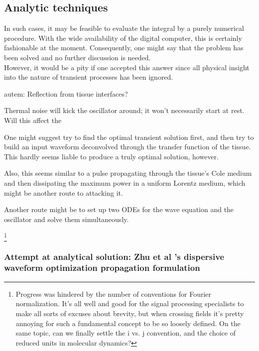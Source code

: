 \documentclass[paper.tex]{subfiles}
\begin{document}
\subsection{Analytic techniques}


\begin{fquote}
	In such cases, it may be feasible to evaluate the integral by a purely numerical procedure. With the wide availability of the digital computer, this is certainly fashionable at the moment. Consequently, one might say that the problem has been solved and no further discussion is needed. \\
	
	However, it would be a pity if one accepted this answer since all physical insight into the nature of transient processes has been ignored. 
\end{fquote}



\begin{autem}
	autem: 
Reflection from tissue interfaces?

Thermal noise will kick the oscillator around; it won't necessarily start at rest. Will this affect the 
\end{autem}

One might suggest try to find the optimal transient solution first, and then try to build an input waveform deconvolved through the  transfer function of the tissue. This hardly seems liable to produce a truly optimal solution, however.


Also, this seems similar to a pulse propagating through the tissue's Cole medium and then dissipating the maximum power in a uniform Lorentz medium, which might be another route to attacking it.

Another route might be to set up two ODEs for the wave equation and the oscillator and solve them simultaneously.

\footnote{Progress was hindered by the number of conventions for Fourier normalization. It's all well and good for the signal processing specialists to make all sorts of excuses about brevity, but when crossing fields it's pretty annoying for such a fundamental concept to be so loosely defined. On the same topic, can we finally settle the i vs. j convention, and the choice of reduced units in molecular dynamics?}


\subsubsection{Attempt at analytical solution: Zhu et al 's dispersive waveform optimization propagation formulation}
\end{document}
